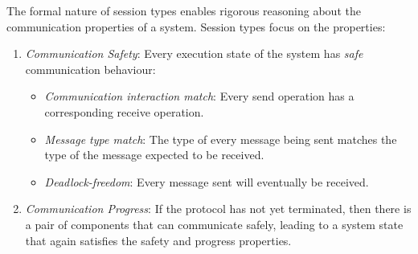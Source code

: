 
The formal nature of session types enables rigorous
reasoning about the communication properties of a system.
Session types %
focus on the %
properties:
%
\begin{enumerate}[label=$\bullet$]
	\item	{\em Communication Safety}: Every execution state of the system has {\em safe} communication behaviour:
	\begin{itemize}
		\item	{\em Communication interaction match}:
				Every send
				operation has a corresponding receive
				operation.
		\item	{\em Message type match}:
				The type of every message being sent matches the type of the message expected to be received.
		\item	{\em Deadlock-freedom}:
				Every message sent will eventually be received.
	\end{itemize}

	\item	{\em Communication Progress}: If the protocol has not yet terminated, then there is a pair of components that can communicate safely, leading to a system state that again satisfies the safety and progress properties.
\end{enumerate}
%
%


